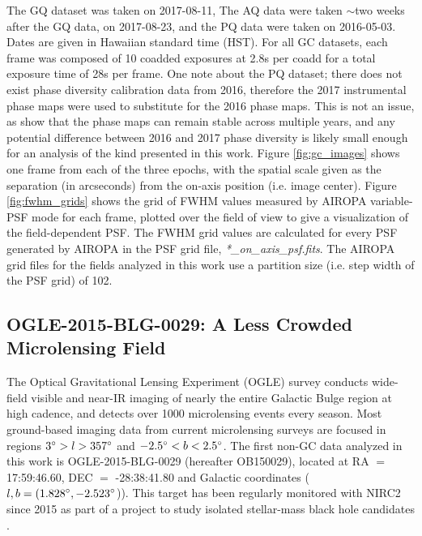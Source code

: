 \documentclass[]{spie}  %
\begin{document}
The GQ dataset was taken on 2017-08-11, The AQ data were taken $\sim$two weeks after the GQ data, on 2017-08-23, and the PQ data were taken on 2016-05-03. Dates are given in Hawaiian standard time (HST). For all GC datasets, each frame was composed of 10 coadded exposures at 2.8s per coadd for a total exposure time of 28s per frame. One note about the PQ dataset; there does not exist phase diversity calibration data from 2016, therefore the 2017 instrumental phase maps were used to substitute for the 2016 phase maps. This is not an issue, as \cite{Ciurlo:inprep} show that the phase maps can remain stable across multiple years, and any potential difference between 2016 and 2017 phase diversity is likely small enough for an analysis of the kind presented in this work. Figure \ref{fig:gc_images} shows one frame from each of the three epochs, with the spatial scale given as the separation (in arcseconds) from the on-axis position (i.e. image center). Figure \ref{fig:fwhm_grids} shows the grid of FWHM values measured by AIROPA variable-PSF mode for each frame, plotted over the field of view to give a visualization of the field-dependent PSF. The FWHM grid values are calculated for every PSF generated by AIROPA in the PSF grid file, \textit{*\_on\_axis\_psf.fits}. The AIROPA grid files for the fields analyzed in this work use a partition size (i.e. step width of the PSF grid) of 102. 


 
\subsection{OGLE-2015-BLG-0029: A Less Crowded Microlensing Field} \label{sec:ogle-data}
The Optical Gravitational Lensing Experiment (OGLE) survey \cite{udalski:1992a} conducts wide-field visible and near-IR imaging of nearly the entire Galactic Bulge region at high cadence, and detects over 1000 microlensing events every season. Most ground-based imaging data from current microlensing surveys are focused in regions $3\degree > l > 357\degree$ and $-2.5\degree < b < 2.5\degree$. The first non-GC data analyzed in this work is OGLE-2015-BLG-0029 (hereafter OB150029), located at RA $=$ 17:59:46.60, DEC $=$ -28:38:41.80 and Galactic coordinates ($l,b = (1.828\degree, -2.523\degree$)). This target has been regularly monitored with NIRC2 since 2015 as part of a project to study isolated stellar-mass black hole candidates \citep{lu:inprep}.
\end{document}
